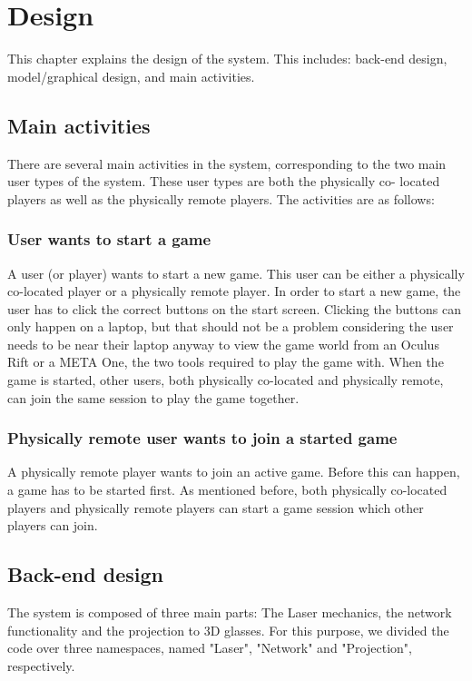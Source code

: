\chapter{Design} \label{cha:design}
	This chapter explains the design of the system. This includes: back-end
	design, model/graphical design, and main activities.

	\section{Main activities} \label{sec:mainactivities}
		There are several main activities in the system, corresponding to the two
		main user types of the system. These user types are both the physically co-
		located	players as well as the physically remote players. The activities
		are as follows:

		\subsection{User wants to start a game} \label{ssec:userstartgame}
			A user (or player) wants to start a new game. This user can be either
			a physically co-located player or a physically remote player. In
			order to start a new game, the user has to click the correct buttons
			on the start screen. Clicking the buttons can only happen on a laptop,
			but that should not be a problem considering the user needs to be near
			their laptop anyway to view the game world from an Oculus Rift or a
			META One, the two tools required to play the game with. When the game
			is started, other users, both physically co-located and physically
			remote, can join the same session to play the game together.

		\subsection{Physically remote user wants to join a started game}
				\label{ssec:remotejoingame}
			A physically remote player wants to join an active game. Before this can
			happen, a game has to be started first. As mentioned before, both physically
			co-located players and physically remote players can start a game session
			which other players can join.

	\section{Back-end design} \label{sec:backenddesign}
		The system is composed of three main parts: The Laser mechanics, the network
		functionality and the projection to 3D glasses. For this purpose, we divided
		the code over three namespaces, named "Laser", "Network" and
		"Projection", respectively.


